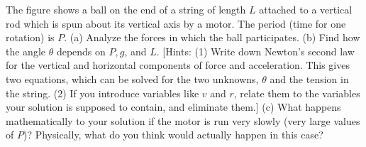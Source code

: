  The figure shows a ball on the end of a string of length
$L$ attached to a vertical rod which is spun about its
vertical axis by a motor. The period (time for one rotation) is $P$.\hwendpart
(a) Analyze the forces in which the ball participates.\hwendpart
(b) Find how the angle $\theta $ depends on $P,g$, and $L$.
[Hints: (1) Write down Newton's second law for the vertical
and horizontal components of force and acceleration. This
gives two equations, which can be solved for the two
unknowns, $\theta $ and the tension in the string. (2) If
you introduce variables like $v$ and $r$, relate them to the
variables your solution is supposed to contain, and eliminate them.]\answercheck\hwendpart
(c) What happens mathematically to your solution if the
motor is run very slowly (very large values of $P$)?
Physically, what do you think would actually happen in this case?
